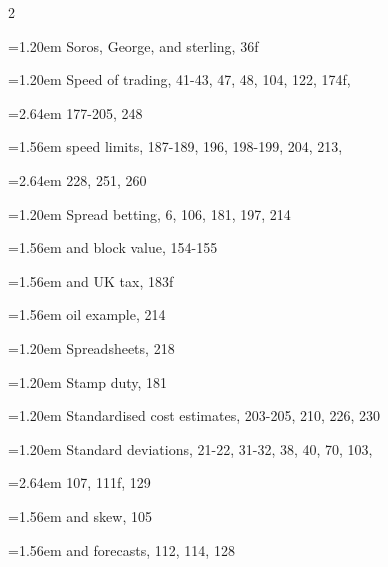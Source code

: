{\begin{multicols}{2}
\par \noindent\hangindent=1.20em\hspace*{0.00em} Soros, George, and sterling, 36f
\par \noindent\hangindent=1.20em\hspace*{0.00em} Speed of trading, 41-43, 47, 48, 104, 122, 174f,
\par \noindent\hangindent=2.64em\hspace*{1.44em} 177-205, 248
\par \noindent\hangindent=1.56em\hspace*{0.36em} speed limits, 187-189, 196, 198-199, 204, 213,
\par \noindent\hangindent=2.64em\hspace*{1.44em} 228, 251, 260
\par \noindent\hangindent=1.20em\hspace*{0.00em} Spread betting, 6, 106, 181, 197, 214
\par \noindent\hangindent=1.56em\hspace*{0.36em} and block value, 154-155
\par \noindent\hangindent=1.56em\hspace*{0.36em} and UK tax, 183f
\par \noindent\hangindent=1.56em\hspace*{0.36em} oil example, 214
\par \noindent\hangindent=1.20em\hspace*{0.00em} Spreadsheets, 218
\par \noindent\hangindent=1.20em\hspace*{0.00em} Stamp duty, 181
\par \noindent\hangindent=1.20em\hspace*{0.00em} Standardised cost estimates, 203-205, 210, 226, 230
\par \noindent\hangindent=1.20em\hspace*{0.00em} Standard deviations, 21-22, 31-32, 38, 40, 70, 103,
\par \noindent\hangindent=2.64em\hspace*{1.44em} 107, 111f, 129
\par \noindent\hangindent=1.56em\hspace*{0.36em} and skew, 105
\par \noindent\hangindent=1.56em\hspace*{0.36em} and forecasts, 112, 114, 128

\end{multicols}}

